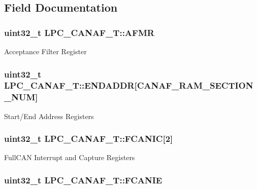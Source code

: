 \subsection{Field Documentation}
\hypertarget{structLPC__CANAF__T_a987f2996cd4432665a2cbde52251f429}{
\subsubsection[{A\-F\-M\-R}]{ uint32\-\_\-t L\-P\-C\-\_\-\-C\-A\-N\-A\-F\-\_\-\-T\-::\-A\-F\-M\-R}}\label{structLPC__CANAF__T_a987f2996cd4432665a2cbde52251f429}
Acceptance Filter Register \hypertarget{structLPC__CANAF__T_ab62d75d561c2446b4ac8ce383e566498}{
\subsubsection[{E\-N\-D\-A\-D\-D\-R}]{ uint32\-\_\-t L\-P\-C\-\_\-\-C\-A\-N\-A\-F\-\_\-\-T\-::\-E\-N\-D\-A\-D\-D\-R\mbox{[}{\bf C\-A\-N\-A\-F\-\_\-\-R\-A\-M\-\_\-\-S\-E\-C\-T\-I\-O\-N\-\_\-\-N\-U\-M}\mbox{]}}}\label{structLPC__CANAF__T_ab62d75d561c2446b4ac8ce383e566498}
Start/\-End Address Registers \hypertarget{structLPC__CANAF__T_a89079a08d1150a7761dff98d0130d7e5}{
\subsubsection[{F\-C\-A\-N\-I\-C}]{ uint32\-\_\-t L\-P\-C\-\_\-\-C\-A\-N\-A\-F\-\_\-\-T\-::\-F\-C\-A\-N\-I\-C\mbox{[}2\mbox{]}}}\label{structLPC__CANAF__T_a89079a08d1150a7761dff98d0130d7e5}
Full\-C\-A\-N Interrupt and Capture Registers \hypertarget{structLPC__CANAF__T_aca9607036e23ed6523777c80e1ab1147}{
\subsubsection[{F\-C\-A\-N\-I\-E}]{ uint32\-\_\-t L\-P\-C\-\_\-\-C\-A\-N\-A\-F\-\_\-\-T\-::\-F\-C\-A\-N\-I\-E}}\label{structLPC__CANAF__T_aca9607036e23ed6523777c80e1ab1147}
